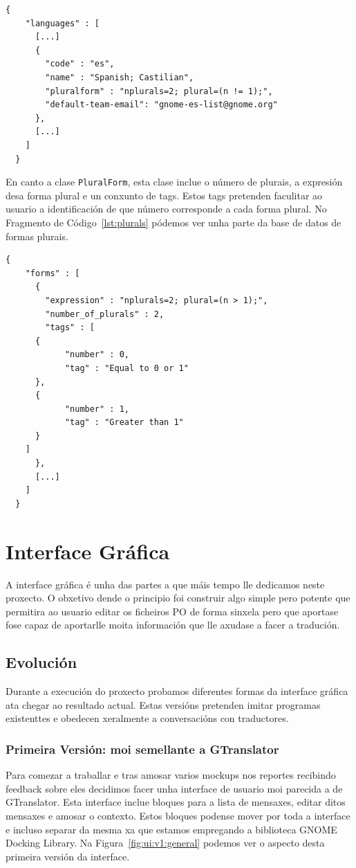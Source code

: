 \begin{lstlisting}[label=lst:languages,caption=Fragmento da Base de Datos de Linguaxes]
  {
    "languages" : [
      [...]
      {
        "code" : "es",
        "name" : "Spanish; Castilian",
        "pluralform" : "nplurals=2; plural=(n != 1);",
        "default-team-email": "gnome-es-list@gnome.org"
      },
      [...]
    ]
  }
\end{lstlisting}

En canto a clase \lstinline{PluralForm}, esta clase inclue o número de plurais, a expresión desa forma plural e un conxunto de tags. Estos tags pretenden faculitar ao usuario a identificación de que número corresponde a cada forma plural. No Fragmento de Código~\ref{lst:plurals} pódemos ver unha parte da base de datos de formas plurais.

\begin{lstlisting}[label=lst:plurals,caption=Fragmento da Base de Datos de Plurais]
  {
    "forms" : [
      {
        "expression" : "nplurals=2; plural=(n > 1);",
        "number_of_plurals" : 2,
        "tags" : [
	  {
            "number" : 0,
            "tag" : "Equal to 0 or 1"
	  },
	  {
            "number" : 1,
            "tag" : "Greater than 1"
	  }
	]
      },
      [...]
    ]
  }
\end{lstlisting}

\section{Interface Gráfica}
A interface gráfica é unha das partes a que máis tempo lle dedicamos neste proxecto. O obxetivo dende o principio foi construir algo simple pero potente que permitira ao usuario editar os ficheiros PO de forma sinxela pero que aportase fose capaz de aportarlle moita información que lle axudase a facer a tradución.

\subsection{Evolución}
Durante a execución do proxecto probamos diferentes formas da interface gráfica ata chegar ao resultado actual. Estas versións pretenden imitar programas existenttes e obedecen xeralmente a conversacións con traductores.

\subsubsection{Primeira Versión: moi semellante a GTranslator}
Para comezar a traballar e tras amosar varios mockups nos reportes recibindo feedback sobre eles decidimos facer unha interface de usuario moi parecida a de GTranslator. Esta interface inclue bloques para a lista de mensaxes, editar ditos mensaxes e amosar o contexto. Estos bloques podense mover por toda a interface e incluso separar da mesma xa que estamos empregando a biblioteca GNOME Docking Library. Na Figura~\ref{fig:ui:v1:general} podemos ver o aspecto desta primeira versión da interface.

